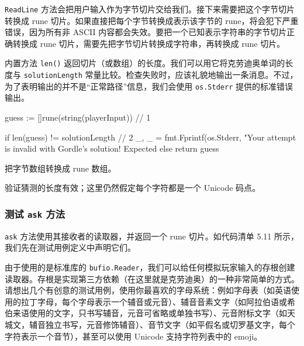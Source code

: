 \texttt{ReadLine} 方法会把用户输入作为字节切片交给我们。接下来需要把这个字节切片转换成 rune 切片。如果直接把每个字节转换成表示该字节的 rune，将会犯下严重错误，因为所有非 ASCII 内容都会失效。要把一个已知表示字符串的字节切片正确转换成 rune 切片，需要先把字节切片转换成字符串，再转换成 rune 切片。

内置方法 \texttt{len()} 返回切片（或数组）的长度。我们可以用它将克劳迪奥单词的长度与 \texttt{solutionLength} 常量比较。检查失败时，应该礼貌地输出一条消息。不过，为了表明输出的并不是“正常路径”信息，我们会使用 \texttt{os.Stderr} 提供的标准错误输出。

\begin{gocode}[title={代码清单 5.10 \texttt{game.go}：使用读取器的 \texttt{ask} 方法}]
guess := []rune(string(playerInput)) // 1

if len(guess) != solutionLength { // 2
    _, _ = fmt.Fprintf(os.Stderr, "Your attempt is invalid with Gordle's solution! Expected %
} else {
    return guess
}
\end{gocode}

\begin{codeannotations}
  \item 把字节数组转换成 rune 数组。
  \item 验证猜测的长度有效；这里仍然假定每个字符都是一个 Unicode 码点。
\end{codeannotations}

\subsubsection*{测试 \texttt{ask} 方法}

\texttt{ask} 方法使用其接收者的读取器，并返回一个 rune 切片。如代码清单 5.11 所示，我们先在测试用例定义中声明它们。

由于使用的是标准库的 \texttt{bufio.Reader}，我们可以给任何模拟玩家输入的存根创建读取器。存根是实现第三方依赖（在这里就是克劳迪奥）的一种非常简单的方式。请想出几个有创意的测试用例，使用你最喜欢的字母系统：例如字母表（如英语使用的拉丁字母，每个字母表示一个辅音或元音）、辅音音素文字（如阿拉伯语或希伯来语使用的文字，只书写辅音，元音可省略或单独书写）、元音附标文字（如天城文，辅音独立书写，元音修饰辅音）、音节文字（如平假名或切罗基文字，每个字符表示一个音节），甚至可以使用 Unicode 支持字符列表中的 emoji。


